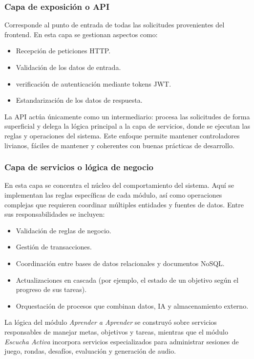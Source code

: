 \subsubsection{Capa de exposición o API}
Corresponde al punto de entrada de todas las solicitudes provenientes del frontend. En esta capa se gestionan aspectos como:

\begin{itemize}
    \item Recepción de peticiones HTTP.
    \item Validación de los datos de entrada.
    \item verificación de autenticación mediante tokens JWT.
    \item Estandarización de los datos de respuesta.
\end{itemize}

La API actúa únicamente como un intermediario: procesa las solicitudes de forma superficial y delega la lógica principal a la capa de servicios, donde se ejecutan las reglas y operaciones del sistema. Este enfoque permite mantener controladores livianos, fáciles de mantener y coherentes con buenas prácticas de desarrollo.

\subsubsection{Capa de servicios o lógica de negocio}
En esta capa se concentra el núcleo del comportamiento del sistema. Aquí se implementan las reglas específicas de cada módulo, así como operaciones complejas que requieren coordinar múltiples entidades y fuentes de datos. Entre sus responsabilidades se incluyen:

\begin{itemize}
    \item Validación de reglas de negocio.
    \item Gestión de transacciones.
    \item Coordinación entre bases de datos relacionales y documentos NoSQL.
    \item Actualizaciones en cascada (por ejemplo, el estado de un objetivo según el progreso de sus tareas).
    \item Orquestación de procesos que combinan datos, IA y almacenamiento externo.
\end{itemize}

La lógica del módulo \textit{Aprender a Aprender} se construyó sobre servicios responsables de manejar metas, objetivos y tareas, mientras que el módulo \textit{Escucha Activa} incorpora servicios especializados para administrar sesiones de juego, rondas, desafíos, evaluación y generación de audio.

